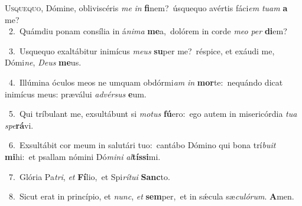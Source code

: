 \lettrine{\initial\textcolor{\initialcolor}{U}}{squequo,} Dómine, obliviscéris \textit{me} \textit{in} \textbf{fi}\-nem?~\star úsquequo avértis fáci\textit{em} \textit{tu}\-\textit{am} \textbf{a} me?\\
{\numbfont\textcolor{\numbcolor}{~2.}}~Quámdiu ponam consília in á\-\textit{ni}\-\textit{ma} \textbf{me}\-a,~\star dolórem in corde \textit{me}\-\textit{o} \textit{per} \textbf{di}\-em?\par
{\numbfont\textcolor{\numbcolor}{~3.}}~Usquequo exaltábitur inimícus \textit{me}\-\textit{us} \textbf{su}\-per me?~\star réspice, et exáudi me, Dómi\-\textit{ne}\-, \textit{De}\-\textit{us} \textbf{me}\-us.\par
{\numbfont\textcolor{\numbcolor}{~4.}}~Illúmina óculos meos ne umquam obdórmi\textit{am} \textit{in} \textbf{mor}\-te:~\star nequándo dicat inimícus meus: præválui \textit{ad}\-\textit{vér}\textit{sus} \textbf{e}\-um.\par
{\numbfont\textcolor{\numbcolor}{~5.}}~Qui tríbulant me, exsultábunt si \textit{mo}\-\textit{tus} \textbf{fú}\-ero:~\star ego autem in misericórdia \textit{tu}\-\textit{a} \textit{spe}\-\textbf{rá}vi.\par
{\numbfont\textcolor{\numbcolor}{~6.}}~Exsultábit cor meum in salutári tuo:~\dagger cantábo Dómino qui bona trí\-\textit{bu}\-\textit{it} \textbf{mi}\-hi:~\star et psallam nómini Dó\-\textit{mi}\-\textit{ni} \textit{al}\-\textbf{tís}\textbf{si}mi.\par
{\numbfont\textcolor{\numbcolor}{~7.}}~Glória Pa\-\textit{tri}\-, \textit{et} \textbf{Fí}\-lio,~\star et Spi\-\textit{rí}\-\textit{tu}\textit{i} \textbf{Sanc}\-to.\par
{\numbfont\textcolor{\numbcolor}{~8.}}~Sicut erat in princípio, et \textit{nunc}\-, \textit{et} \textbf{sem}\-per,~\star et in sǽcula sæ\-\textit{cu}\-\textit{ló}\textit{rum}. \textbf{A}\-men.\par
